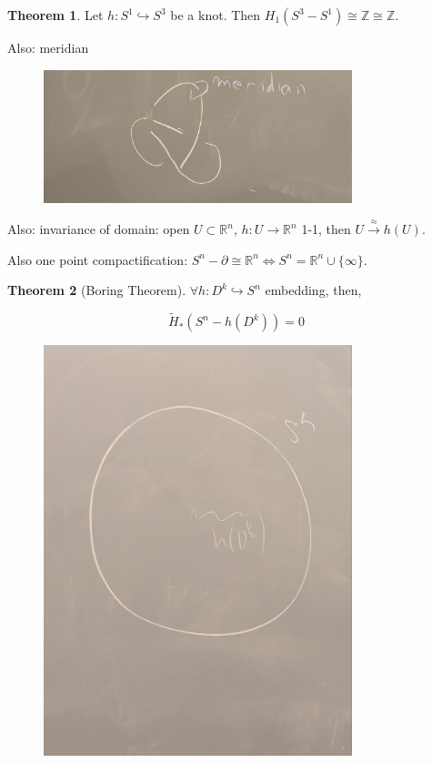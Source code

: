 \documentclass{article}
\theoremstyle{definition}
\newtheorem{theorem}{Theorem}
\begin{document}
    \begin{theorem}
        Let \(h: S^1 \hookrightarrow S^3\) be a knot. Then \(H_1(S^3 - S^1) \cong \mathbb{Z} \cong \mathbb{Z}\).

        Also: meridian

        \begin{figure}[H]
            \centering
            \includegraphics[width=0.8\textwidth]{img/meridian}
            \end{figure}

    \end{theorem}

    Also: invariance of domain: open \(U \subset \mathbb{R}^n\), \(h: U \to \mathbb{R}^n\) 1-1, then \(U \xrightarrow{\approx} h(U)\).

    Also one point compactification: \(S^n - \partial \cong \mathbb{R}^n \iff S^n = \mathbb{R}^n \cup \{ \infty \}\).

    \begin{theorem}
        [Boring Theorem] \(\forall h : D^k \hookrightarrow S^n\) embedding, then,

        \[
            \widetilde{H}_{\ast} (S^n - h(D^k)) = 0
        \]

        \begin{figure}[H]
            \centering
            \includegraphics[width=0.8\textwidth]{img/boring}
        \end{figure}

    \end{theorem}
\end{document}
